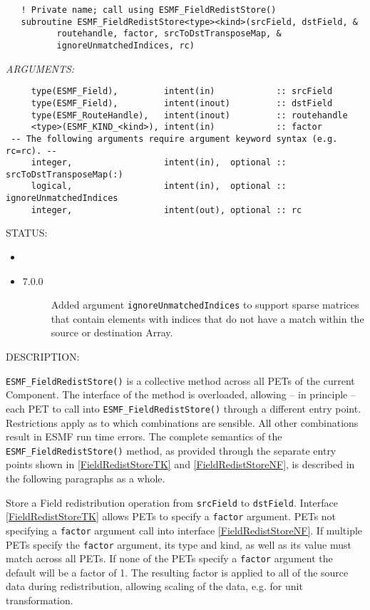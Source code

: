    
\begin{verbatim}   ! Private name; call using ESMF_FieldRedistStore() 
   subroutine ESMF_FieldRedistStore<type><kind>(srcField, dstField, & 
          routehandle, factor, srcToDstTransposeMap, &
          ignoreUnmatchedIndices, rc) 
   \end{verbatim}{\em ARGUMENTS:}
\begin{verbatim}     type(ESMF_Field),         intent(in)            :: srcField  
     type(ESMF_Field),         intent(inout)         :: dstField  
     type(ESMF_RouteHandle),   intent(inout)         :: routehandle
     <type>(ESMF_KIND_<kind>), intent(in)            :: factor 
 -- The following arguments require argument keyword syntax (e.g. rc=rc). --
     integer,                  intent(in),  optional :: srcToDstTransposeMap(:) 
     logical,                  intent(in),  optional :: ignoreUnmatchedIndices
     integer,                  intent(out), optional :: rc 
   \end{verbatim}
{\sf STATUS:}
   \begin{itemize}
   \item{}
   \item{}
   \begin{description}
   \item[7.0.0] Added argument {\tt ignoreUnmatchedIndices} to support sparse 
                matrices that contain elements with indices that do not have a
                match within the source or destination Array.
   \end{description}
   \end{itemize}
  
{\sf DESCRIPTION:\\ }

 
   \label{FieldRedistStoreTK}
   {\tt ESMF\_FieldRedistStore()} is a collective method across all PETs of the
   current Component. The interface of the method is overloaded, allowing 
   -- in principle -- each PET to call into {\tt ESMF\_FieldRedistStore()}
   through a different entry point. Restrictions apply as to which combinations
   are sensible. All other combinations result in ESMF run time errors. The
   complete semantics of the {\tt ESMF\_FieldRedistStore()} method, as provided
   through the separate entry points shown in \ref{FieldRedistStoreTK} and
   \ref{FieldRedistStoreNF}, is described in the following paragraphs as a whole.
  
   Store a Field redistribution operation from {\tt srcField} to {\tt dstField}.
   Interface \ref{FieldRedistStoreTK} allows PETs to specify a {\tt factor}
   argument. PETs not specifying a {\tt factor} argument call into interface
   \ref{FieldRedistStoreNF}. If multiple PETs specify the {\tt factor} argument,
   its type and kind, as well as its value must match across all PETs. If none
   of the PETs specify a {\tt factor} argument the default will be a factor of
   1. The resulting factor is applied to all of the source data during
   redistribution, allowing scaling of the data, e.g. for unit transformation.
    
